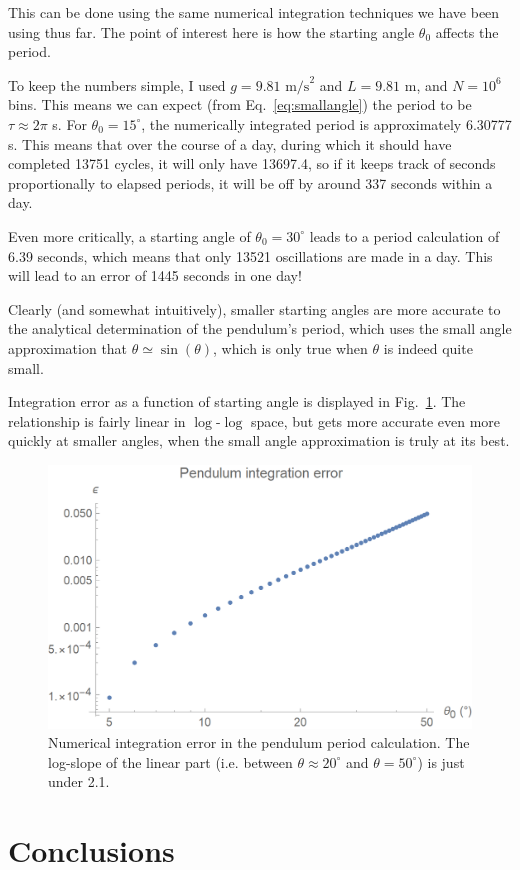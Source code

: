 \documentclass{article}
\begin{document}
This can be done using the same numerical integration techniques we have been using thus far. The point of interest here is how the starting angle $\theta_0$ affects the period.

To keep the numbers simple, I used $g=9.81\text{ m/s}^2$ and $L=9.81$ m, and $N=10^6$ bins. This means we can expect (from Eq.~\ref{eq:smallangle}) the period to be $\tau\approx2\pi$ s. For $\theta_0=15^\circ$, the numerically integrated period is approximately 6.30777 s. This means that over the course of a day, during which it should have completed 13751 cycles, it will only have 13697.4, so if it keeps track of seconds proportionally to elapsed periods, it will be off by around 337 seconds within a day.

Even more critically, a starting angle of $\theta_0=30^\circ$ leads to a period calculation of 6.39 seconds, which means that only 13521 oscillations are made in a day. This will lead to an error of 1445 seconds in one day!

Clearly (and somewhat intuitively), smaller starting angles are more accurate to the analytical determination of the pendulum's period, which uses the small angle approximation that $\theta \simeq \sin(\theta)$, which is only true when $\theta$ is indeed quite small.

\bigskip
{}
\medskip

Integration error as a function of starting angle is displayed in Fig.~\ref{fig:pendulum}. The relationship is fairly linear in $\log$-$\log$ space, but gets more accurate even more quickly at smaller angles, when the small angle approximation is truly at its best.

\begin{figure}[!h]
    \centering
    \includegraphics[width=4.75in]{homework2/pendulum.png}
    \caption{Numerical integration error in the pendulum period calculation. The log-slope of the linear part (i.e. between $\theta\approx20^\circ$ and $\theta=50^\circ$) is just under 2.1.}
    \label{fig:pendulum}
\end{figure}

\newpage

\section{Conclusions}
\end{document}
